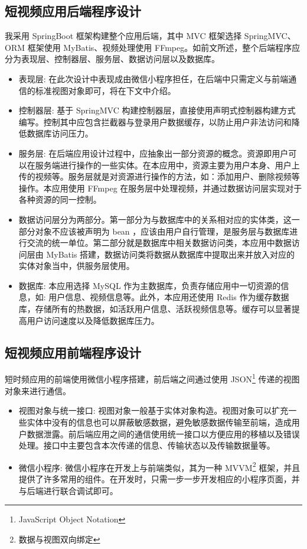 \documentclass[a4paper, 12pt, UTF8]{ctexart}
\begin{document}
	\subsection{短视频应用后端程序设计}
	我采用 SpringBoot 框架构建整个应用后端，其中 MVC 框架选择 SpringMVC、ORM 框架使用 MyBatis、视频处理使用 FFmpeg。如前文所述，整个后端程序应分为表现层、控制器层、服务层、数据访问层以及数据库。
	\begin{itemize}
  \item 表现层: 在此次设计中表现成由微信小程序担任，在后端中只需定义与前端通信的标准视图对象即可，将在下文中介绍。
  \item 控制器层: 基于 SpringMVC 构建控制器层，直接使用声明式控制器构建方式编写。控制其中应包含拦截器与登录用户数据缓存，以防止用户非法访问和降低数据库访问压力。
  \item 服务层: 在后端应用设计过程中，应抽象出一部分资源的概念。资源即用户可以在服务端进行操作的一些实体。在本应用中，资源主要为用户本身、用户上传的视频等。服务层就是对资源进行操作的方法，如：添加用户、删除视频等操作。本应用使用 FFmpeg 在服务层中处理视频，并通过数据访问层实现对于各种资源的同一控制。
  \item 数据访问层分为两部分。第一部分为与数据库中的关系相对应的实体类，这一部分对象不应该被声明为 bean ，应该由用户自行管理，是服务层与数据库进行交流的统一单位。第二部分就是数据库中相关数据访问类，本应用中数据访问层由 MyBatis 搭建，数据访问类将数据从数据库中提取出来并放入对应的实体对象当中，供服务层使用。
  \item 数据库: 本应用选择 MySQL 作为主数据库，负责存储应用中一切资源的信息，如: 用户信息、视频信息等。此外，本应用还使用 Redis 作为缓存数据库，存储所有的热数据，如活跃用户信息、活跃视频信息等。缓存可以显著提高用户访问速度以及降低数据库压力。
\end{itemize}

	\subsection{短视频应用前端程序设计}
	短时频应用的前端使用微信小程序搭建，前后端之间通过使用 JSON\footnote{JavaScript Object Notation} 传递的视图对象来进行通信。
	\begin{itemize}
  \item 视图对象与统一接口: 视图对象一般基于实体对象构造。视图对象可以扩充一些实体中没有的信息也可以屏蔽敏感数据，避免敏感数据传输至前端，造成用户数据泄露。前后端应用之间的通信使用统一接口以方便应用的移植以及错误处理。接口中主要包含本次传递的信息、传输状态以及传输数据量等。
  \item 微信小程序: 微信小程序在开发上与前端类似，其为一种 MVVM\footnote{数据与视图双向绑定} 框架，并且提供了许多常用的组件。在开发时，只需一步一步开发相应的小程序页面，并与后端进行联合调试即可。
\end{itemize}
\end{document}
